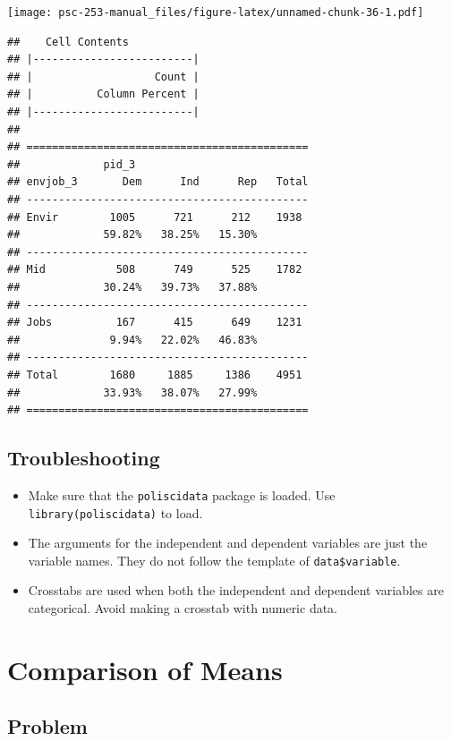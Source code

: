\documentclass[
]{book}
\providecommand{\tightlist}{%
  \setlength{\itemsep}{0pt}\setlength{\parskip}{0pt}}
\begin{document}
\texttt{[image: psc-253-manual\_files/figure-latex/unnamed-chunk-36-1.pdf]}

\begin{verbatim}
##    Cell Contents 
## |-------------------------|
## |                   Count | 
## |          Column Percent | 
## |-------------------------|
## 
## ============================================
##             pid_3
## envjob_3       Dem      Ind      Rep   Total
## --------------------------------------------
## Envir        1005      721      212    1938 
##             59.82%   38.25%   15.30%        
## --------------------------------------------
## Mid           508      749      525    1782 
##             30.24%   39.73%   37.88%        
## --------------------------------------------
## Jobs          167      415      649    1231 
##              9.94%   22.02%   46.83%        
## --------------------------------------------
## Total        1680     1885     1386    4951 
##             33.93%   38.07%   27.99%        
## ============================================
\end{verbatim}

\hypertarget{troubleshooting-10}{%
\subsection{Troubleshooting}\label{troubleshooting-10}}

\begin{itemize}
\tightlist
\item
  Make sure that the \texttt{poliscidata} package is loaded. Use \texttt{library(poliscidata)} to load.
\item
  The arguments for the independent and dependent variables are just the variable names. They do not follow the template of \texttt{data\$variable}.
\item
  Crosstabs are used when both the independent and dependent variables are categorical. Avoid making a crosstab with numeric data.
\end{itemize}

\hypertarget{compmeans}{%
\section{Comparison of Means}\label{compmeans}}

\hypertarget{problem-14}{%
\subsection{Problem}\label{problem-14}}
\end{document}
